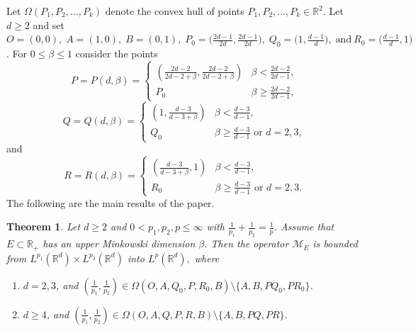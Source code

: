 \documentclass[a4paper,reqno]{amsart}
\newtheorem{theorem}[thm]{Theorem}
\numberwithin{equation}{section}
\newcommand{\R}{{\mathbb {R}}}
\begin{document}
	Let $\Omega({P_1,P_2,\dots,P_k})$ denote the convex hull of points $P_1,P_2,\dots,P_k\in\R^2$.  Let $d\geq2$ and set $O = (0, 0),\; A = (1, 0),\; B = (0, 1),\; P_0=\big(\frac{2d-1}{2d},\frac{2d-1}{2d}\big),\; Q_0=\big(1,\frac{d-1}{d}\big), \;\text{and}~ R_0=\big(\frac{d-1}{d},1\big)$. For $0\leq\beta\leq1$ consider the points
	\[P=P(d,\beta)=\begin{cases} 
		\left(\frac{2d-2}{2d-2+\beta},\frac{2d-2}{2d-2+\beta}\right) & \beta<\frac{2d-2}{2d-1}, \\
		P_0 & \beta\geq \frac{2d-2}{2d-1},
	\end{cases}\]
	\[Q=Q(d,\beta)=\begin{cases} 
		\left(1,\frac{d-3}{d-3+\beta}\right) & \beta<\frac{d-3}{d-1}, \\
		Q_0 & \beta\geq \frac{d-3}{d-1} \text{ or }d=2,3,
	\end{cases}\]
	and 
	\[R=R(d,\beta)=\begin{cases} 
		\left(\frac{d-3}{d-3+\beta},1\right) & \beta<\frac{d-3}{d-1}, \\
		R_0 & \beta\geq \frac{d-3}{d-1} \text{ or }d=2,3.\end{cases}\]
	The following are the main results of the paper.
	\begin{theorem}\label{main}
		Let $d\geq2$ and $0<p_1,p_2,p\leq\infty$ with $\frac{1}{p_1}+\frac{1}{p_2}=\frac{1}{p}$.  Assume that $E\subset\R_+$ has an upper Minkowski dimension $\beta$. Then the operator $\mathcal{M}_E$ is bounded from $L^{p_1}(\mathbb{R}^{d})\times L^{p_2}(\mathbb{R}^{d})$ into $L^{p}(\mathbb{R}^{d}),$ where 
		\begin{enumerate}
			\item $d=2,3$, and $(\frac{1}{p_1},\frac{1}{p_2})\in \Omega(O,A,Q_0,P,R_0,B)\setminus \{A,B,PQ_0,PR_0\}$.
			\item $d\geq4$, and $(\frac{1}{p_1},\frac{1}{p_2})\in \Omega(O,A,Q,P,R,B)\setminus \{A,B,PQ,PR\}$.
		\end{enumerate}
	\end{theorem}
\end{document}
